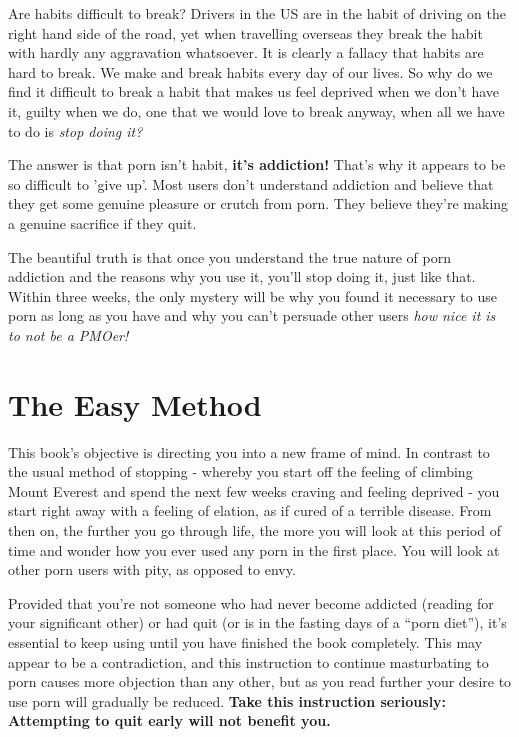 \documentclass[
]{book}
\begin{document}
Are habits difficult to break? Drivers in the US are in the habit of driving on the right hand side of the road, yet when travelling overseas they break the habit with hardly any aggravation whatsoever. It is clearly a fallacy that habits are hard to break. We make and break habits every day of our lives. So why do we find it difficult to break a habit that makes us feel deprived when we don't have it, guilty when we do, one that we would love to break anyway, when all we have to do is \emph{stop doing it?}

The answer is that porn isn't habit, \textbf{it's addiction!} That's why it appears to be so difficult to 'give up'. Most users don't understand addiction and believe that they get some genuine pleasure or crutch from porn. They believe they're making a genuine sacrifice if they quit.

The beautiful truth is that once you understand the true nature of porn addiction and the reasons why you use it, you'll stop doing it, just like that. Within three weeks, the only mystery will be why you found it necessary to use porn as long as you have and why you can't persuade other users \emph{how nice it is to not be a PMOer!}

\hypertarget{the-easy-method}{%
\chapter{The Easy Method}\label{the-easy-method}}

This book's objective is directing you into a new frame of mind. In contrast to the usual method of stopping - whereby you start off the feeling of climbing Mount Everest and spend the next few weeks craving and feeling deprived - you start right away with a feeling of elation, as if cured of a terrible disease. From then on, the further you go through life, the more you will look at this period of time and wonder how you ever used any porn in the first place. You will look at other porn users with pity, as opposed to envy.

Provided that you're not someone who had never become addicted (reading for your significant other) or had quit (or is in the fasting days of a ``porn diet''), it's essential to keep using until you have finished the book completely. This may appear to be a contradiction, and this instruction to continue masturbating to porn causes more objection than any other, but as you read further your desire to use porn will gradually be reduced. \textbf{Take this instruction seriously: Attempting to quit early will not benefit you.}
\end{document}
